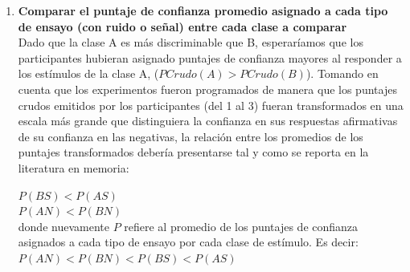 \begin{enumerate}
\item \textbf{Comparar el puntaje de confianza promedio asignado a cada tipo de ensayo (con ruido o señal) entre cada clase a comparar}\\

Dado que la clase A es más discriminable que B, esperaríamos que los participantes hubieran asignado puntajes de confianza mayores al responder a los estímulos de la clase A, ($PCrudo(A) > PCrudo(B)$). Tomando en cuenta que los experimentos fueron programados de manera que los puntajes crudos emitidos por los participantes (del 1 al 3) fueran transformados en una escala más grande que distinguiera la confianza en sus respuestas afirmativas de su confianza en las negativas, la relación entre los promedios de los puntajes transformados debería presentarse tal y como se reporta en la literatura en memoria:





\begin{center}
$P(BS) < P(AS)$\\
$P(AN) < P(BN)$\\
donde nuevamente $P$ refiere al promedio de los puntajes de confianza asignados a cada tipo de ensayo por cada clase de estímulo. Es decir:\\
$P(AN) < P(BN) < P(BS) < P(AS)$\\
\end{center}


\end{enumerate}
